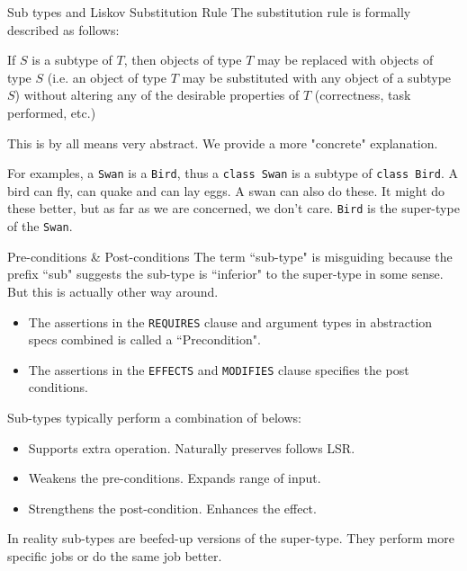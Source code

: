 \begin{frame}[allowframebreaks]{Sub types and Liskov Substitution Rule}
The substitution rule is formally described as follows:
\begin{center}
 If $S$ is a subtype of $T$, then objects of type $T$ may be replaced with objects of type $S$ (i.e. an object of type $T$ may be substituted with any object of a subtype $S$) without altering any of the desirable properties of $T$ (correctness, task performed, etc.)
\end{center}
This is by all means very abstract. We provide a more "concrete" explanation.

\begin{center}
\end{center}

For examples, a \texttt{Swan} \alert{is a} \texttt{Bird}, thus a \texttt{class Swan} is a subtype of \texttt{class Bird}. A bird can fly, can quake and can lay eggs. A swan can also do these. It might do these better, but as far as we are concerned, we don't care. \texttt{Bird} is the super-type of the \texttt{Swan}.
\end{frame}

\begin{frame}{Pre-conditions \& Post-conditions}
The term ``sub-type" is misguiding because the prefix ``sub" suggests the sub-type is ``inferior" to the super-type in some sense. But this is actually other way around. 

\begin{itemize}
	\item The assertions in the \texttt{REQUIRES} clause and argument types in abstraction specs combined is called a ``Precondition".
	\item The assertions in the \texttt{EFFECTS} and \texttt{MODIFIES} clause specifies the post conditions. 
\end{itemize}

Sub-types typically perform a combination of belows:
\begin{itemize}
	\item Supports extra operation. Naturally preserves follows LSR.
	\item Weakens the pre-conditions. Expands range of input.
	\item Strengthens the post-condition. Enhances the effect.
\end{itemize}
In reality sub-types are beefed-up versions of the super-type. They perform more specific jobs or do the same job better.
\end{frame}

